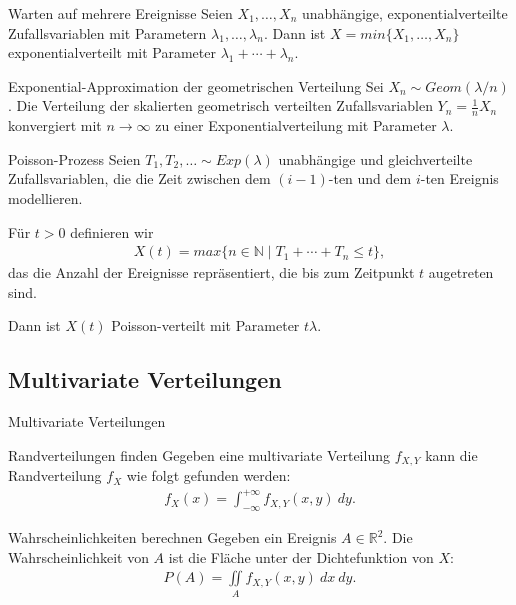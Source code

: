 \documentclass{beamer}
\def\padding{\vspace{0.5cm}}
\begin{document}
\begin{frame}
    \begin{block}{Warten auf mehrere Ereignisse}
        Seien $X_1, \dots, X_n$ unabhängige, exponentialverteilte Zufallsvariablen mit Parametern $\lambda_1, \dots, \lambda_n$. Dann ist $X = min \{X_1, \dots, X_n\}$ exponentialverteilt mit Parameter $\lambda_1 + \cdots + \lambda_n$.
    \end{block}\pause\par\padding
    \begin{block}{Exponential-Approximation der geometrischen Verteilung}
        Sei $X_n \sim Geom(\lambda / n)$. Die Verteilung der skalierten geometrisch verteilten Zufallsvariablen $Y_n = \frac{1}{n} X_n$ konvergiert mit $n \to \infty$ zu einer Exponentialverteilung mit Parameter $\lambda$.
    \end{block}
\end{frame}

\begin{frame}
    \begin{block}{Poisson-Prozess}
        Seien $T_1, T_2, \ldots \sim Exp(\lambda)$ unabhängige und gleichverteilte Zufallsvariablen, die die Zeit zwischen dem $(i - 1)$-ten und dem $i$-ten Ereignis modellieren.\pause\par
        Für $t > 0$ definieren wir
        \begin{align*}
            X(t) = max \{n \in \mathbb{N} \mid T_1 + \cdots + T_n \leq t\},
        \end{align*}
        das die Anzahl der Ereignisse repräsentiert, die bis zum Zeitpunkt $t$ augetreten sind.\pause\par
        Dann ist $X(t)$ Poisson-verteilt mit Parameter $t \lambda$.
    \end{block}
\end{frame}

\subsection{Multivariate Verteilungen}
\begin{frame}{Multivariate Verteilungen}
    \begin{block}{Randverteilungen finden}
        Gegeben eine multivariate Verteilung $f_{X,Y}$ kann die Randverteilung $f_X$ wie folgt gefunden werden:
        \begin{align*}
            f_X(x) = \int_{- \infty}^{+ \infty} f_{X,Y}(x,y)\ dy.
        \end{align*}
    \end{block}\pause\par\padding
    \begin{block}{Wahrscheinlichkeiten berechnen}
        Gegeben ein Ereignis $A \in \mathbb{R}^2$. Die Wahrscheinlichkeit von $A$ ist die Fläche unter der Dichtefunktion von $X$:
        \begin{align*}
            P(A) = \iint\limits_{A} f_{X,Y}(x,y)\ dx\ dy.
        \end{align*}
    \end{block}
\end{frame}
\end{document}
